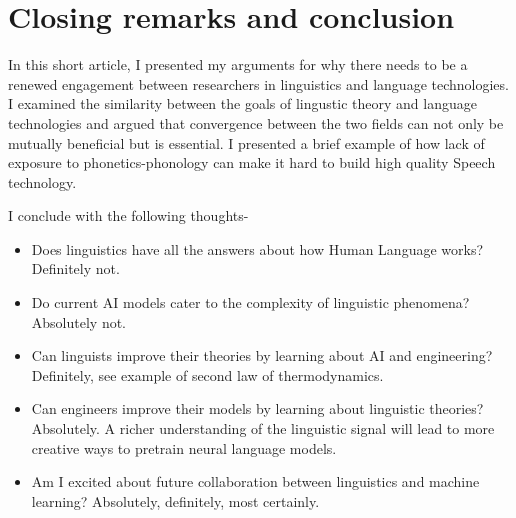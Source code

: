 \documentclass{article}
\begin{document}
\section{Closing remarks and conclusion}

In this short article, I presented my arguments for why there needs to be a renewed engagement between researchers in linguistics and language technologies. I examined the similarity between the goals of lingustic theory and language technologies and argued that convergence between the two fields can not only be mutually beneficial but is essential. I presented a brief example of how lack of exposure to phonetics-phonology can make it hard to build high quality Speech technology. 

I conclude with the following thoughts-  
\begin{itemize}
    \item Does linguistics have all the answers about how Human Language works? Definitely not.
    \item Do current AI models cater to the complexity of linguistic phenomena? Absolutely not.
    \item Can linguists improve their theories by learning about AI and engineering? Definitely, see example of second law of thermodynamics. 
    \item Can engineers improve their models by learning about linguistic theories? Absolutely. A richer understanding of the linguistic signal will lead to more creative ways to pretrain neural language models. 
    
    \item Am I excited about future collaboration between linguistics and machine learning? Absolutely, definitely, most certainly.
\end{itemize}
\end{document}
